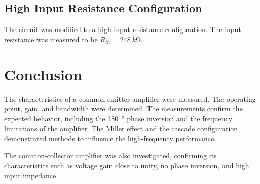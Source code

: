 \documentclass[12pt,a4paper]{article}
\begin{document}
\subsection{High Input Resistance Configuration}
The circuit was modified to a high input resistance configuration. The input resistance was measured to be $R_{in} = \SI{248}{k\ohm}$.

\section{Conclusion}
The characteristics of a common-emitter amplifier were measured. The operating point, gain, and bandwidth were determined. The measurements confirm the expected behavior, including the \SI{180}{\degree} phase inversion and the frequency limitations of the amplifier. The Miller effect and the cascade configuration demonstrated methods to influence the high-frequency performance.

The common-collector amplifier was also investigated, confirming its characteristics such as voltage gain close to unity, no phase inversion, and high input impedance.
\end{document}
